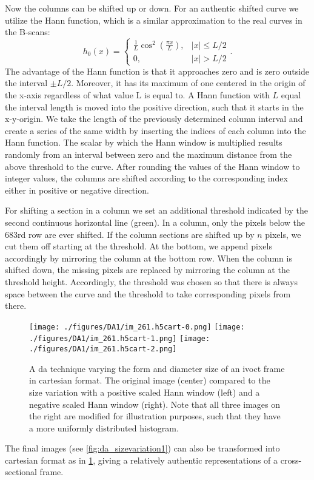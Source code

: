 Now the columns can be shifted up or down. For an authentic shifted curve we utilize the Hann function, which is a similar approximation to the real curves in the B-scans:
\begin{equation}
h_{0}(x) =
\begin{cases}
\frac{1}{L} \cos ^{2}\left(\frac{\pi x}{L}\right), & |x| \leq L / 2 \\
0, & |x|>L / 2
\end{cases}.
\end{equation}
The advantage of the Hann function is that it approaches zero and is zero outside the interval \( \pm L/2 \). Moreover, it has its maximum of one centered in the origin of the x-axis regardless of what value L is equal to. A Hann function with \( L \) equal the interval length is moved into the positive direction, such that it starts in the x-y-origin. We take the length of the previously determined column interval and create a series of the same width by inserting the indices of each column into the Hann function. The scalar by which the Hann window is multiplied results randomly from an interval between zero and the maximum distance from the above threshold to the curve. After rounding the values of the Hann window to integer values, the columns are shifted according to the corresponding index either in positive or negative direction. 

For shifting a section in a column we set an additional threshold indicated by the second continuous horizontal line (green). In a column, only the pixels below the 683rd row are ever shifted. If the column sections are shifted up by \( n \) pixels, we cut them off starting at the threshold. At the bottom, we append pixels accordingly by mirroring the column at the bottom row. When the column is shifted down, the missing pixels are replaced by mirroring the column at the threshold height. Accordingly, the threshold was chosen so that there is always space between the curve and the threshold to take corresponding pixels from there.

\begin{figure}[H]
    \centering
    \texttt{[image: ./figures/DA1/im\_261.h5cart-0.png]}\hfill
    \texttt{[image: ./figures/DA1/im\_261.h5cart-1.png]}\hfill
    \texttt{[image: ./figures/DA1/im\_261.h5cart-2.png]}
    \caption[\Acrshort{da} technique: cartesian vessel form variation]{A \acrshort{da} technique varying the form and diameter size of an \acrshort{ivoct} frame in cartesian format. The original image (center) compared to the size variation with a positive scaled Hann window (left) and a negative scaled Hann window (right). Note that all three images on the right are modified for illustration purposes, such that they have a more uniformly distributed histogram.}
    \label{fig:da_sizevariation2}
\end{figure}
The final images (see \cref{fig:da_sizevariation1}) can also be transformed into cartesian format as in \cref{fig:da_sizevariation2}, giving a relatively authentic representations of a cross-sectional frame.

